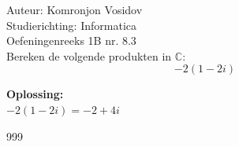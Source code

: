 \documentclass[a4paper]{article}
\begin{document}
	
	\noindent \large Auteur: Komronjon Vosidov \\
	\noindent \large Studierichting: Informatica\\
	\noindent \large Oefeningenreeks 1B nr. 8.3\\
	
	
	
	\normalsize
	Bereken de volgende produkten in $\mathbb{C}$:
	\begin{equation*}
		-2(1-2i)
	\end{equation*}
	
	
	\textbf{Oplossing:}\\
	
	$-2(1-2i)=-2+4i$ \\	
	
	
	\begin{thebibliography}{999}
		
	\end{thebibliography}	
	
	
\end{document}
